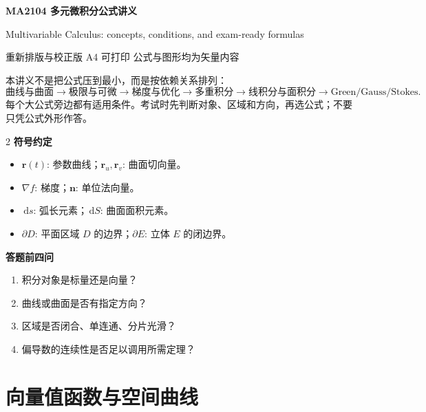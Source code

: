 \documentclass[UTF8,a4paper,10pt,fontset=fandol]{ctexart}
\newcommand{\dd}{\,\mathrm{d}}
\newcommand{\vect}[1]{\mathbf{#1}}
\begin{document}
\begin{tcolorbox}[
  enhanced,colback=navy,colframe=navy,arc=3mm,boxrule=0pt,
  left=6mm,right=6mm,top=7mm,bottom=6mm
]
{\color{white}\fontsize{23}{26}\selectfont\bfseries MA2104 多元微积分公式讲义}\par
\vspace{2mm}
{\color{white!88}\large Multivariable Calculus: concepts, conditions, and exam-ready formulas}\par
\vspace{4mm}
{\color{white!78}\small 重新排版与校正版 \quad A4 可打印 \quad 公式与图形均为矢量内容}
\end{tcolorbox}

\begin{concept}[怎么使用这份讲义]
本讲义不是把公式压到最小，而是按依赖关系排列：
\[
\text{曲线与曲面}
\longrightarrow \text{极限与可微}
\longrightarrow \text{梯度与优化}
\longrightarrow \text{多重积分}
\longrightarrow \text{线积分与面积分}
\longrightarrow \text{Green/Gauss/Stokes}.
\]
每个大公式旁边都有适用条件。考试时先判断对象、区域和方向，再选公式；不要只凭公式外形作答。
\end{concept}

\begin{multicols}{2}
\textbf{符号约定}
\begin{itemize}
  \item $\vect r(t)$: 参数曲线；$\vect r_u,\vect r_v$: 曲面切向量。
  \item $\nabla f$: 梯度；$\vect n$: 单位法向量。
  \item $\dd s$: 弧长元素；$\dd S$: 曲面面积元素。
  \item $\partial D$: 平面区域 $D$ 的边界；$\partial E$: 立体 $E$ 的闭边界。
\end{itemize}

\columnbreak
\textbf{答题前四问}
\begin{enumerate}
  \item 积分对象是标量还是向量？
  \item 曲线或曲面是否有指定方向？
  \item 区域是否闭合、单连通、分片光滑？
  \item 偏导数的连续性是否足以调用所需定理？
\end{enumerate}
\end{multicols}

\tableofcontents
\newpage

\section{向量值函数与空间曲线}
\end{document}

